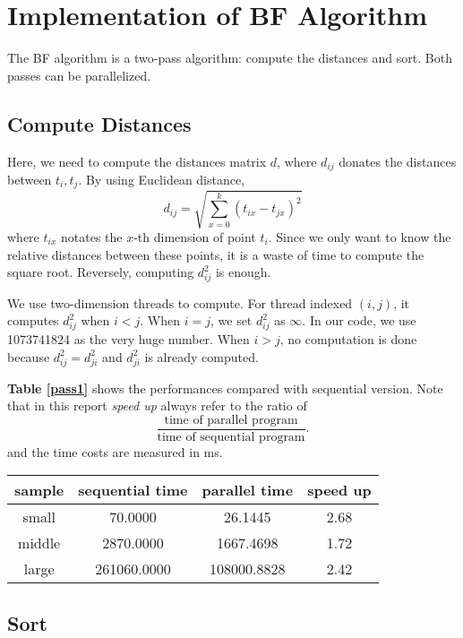 \documentclass[11pt, a4paper]{article}
\makeatletter
\newcommand\tcaption{\def\@captype{table}\caption}
\newcommand{\tref}[1]{\textbf{Table \ref{#1}}}
\makeatother
\begin{document}
\section{Implementation of BF Algorithm}

The BF algorithm is a two-pass algorithm: compute the distances and sort. Both passes can be parallelized.

\subsection{Compute Distances}

Here, we need to compute the distances matrix $d$, where $d_{ij}$ donates the distances between $t_i, t_j$. By using Euclidean distance, $$
    d_{ij} = \sqrt{\sum_{x=0}^k (t_{ix}-t_{jx}) ^ 2}
$$
where $t_{ix}$ notates the $x$-th dimension of point $t_i$. Since we only want to know the relative distances between these points, it is a waste of time to compute the square root. Reversely, computing $d^2_{ij}$ is enough.

We use two-dimension threads to compute. For thread indexed $(i,j)$, it computes $d^2_{ij}$ when $i < j$. When $i = j$, we set $d^2_{ij}$ as $\infty$. In our code, we use 1073741824 as the very huge number. When $i > j$, no computation is done because $d^2_{ij}=d^2_{ji}$ and $d^2_{ji}$ is already computed.

\tref{pass1} shows the performances compared with sequential version. Note that in this report \textit{speed up} always refer to the ratio of $$
    \frac{\mbox{time of parallel program}}{\mbox{time of sequential program}}.
$$ and the time costs are measured in ms.

\begin{center}
    \tcaption{Time cost of first pass: compute distances}\label{pass1}
    \begin{tabular}{cccc}
        \toprule
        sample & sequential time & parallel time & speed up \\
        \midrule
        small & 70.0000 & 26.1445 & 2.68 \\
        middle & 2870.0000 & 1667.4698 & 1.72 \\
        large & 261060.0000 & 108000.8828 & 2.42 \\
        \bottomrule
    \end{tabular}
\end{center}

\subsection{Sort}
\end{document}
